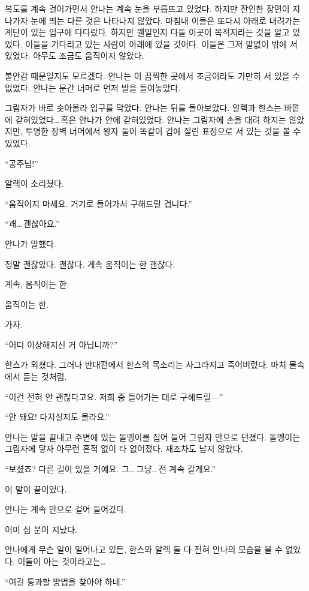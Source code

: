 복도를 계속 걸어가면서 안나는 계속 눈을 부릅뜨고 있었다. 하지만 잔인한 장면이 지나가자 눈에 띄는 다른 것은 나타나지 않았다. 마침내 이들은 또다시 아래로 내려가는 계단이 있는 입구에 다다랐다. 하지만 웬일인지 다들 이곳이 목적지라는 것을 알고 있었다. 이들을 기다리고 있는 사람이 아래에 있을 것이다. 이들은 그저 말없이 밖에 서 있었다. 아무도 조금도 움직이지 않았다.

불안감 때문일지도 모르겠다. 안나는 이 끔찍한 곳에서 조금이라도 가만히 서 있을 수 없었다. 안나는 문간 너머로 먼저 발을 들여놓았다.

그림자가 바로 솟아올라 입구를 막았다. 안나는 뒤를 돌아보았다. 알렉과 한스는 바깥에 갇혀있었다\ldots\,혹은 안나가 안에 갇혀있었다. 안나는 그림자에 손을 대려 하지는 않았지만, 투명한 장벽 너머에서 왕자 둘이 똑같이 겁에 질린 표정으로 서 있는 것을 볼 수 있었다.

``공주님!''

알렉이 소리쳤다.

``움직이지 마세요. 거기로 들어가서 구해드릴 겁니다.''

``괘\ldots\,괜찮아요.''

안나가 말했다.

정말 괜찮았다. 괜찮다. 계속 움직이는 한 괜찮다.

계속, 움직이는 한.

움직이는 한.

가자.

``어디 이상해지신 거 아닙니까?''

한스가 외쳤다. 그러나 반대편에서 한스의 목소리는 사그라지고 죽어버렸다. 마치 물속에서 듣는 것처럼.

``이건 전혀 안 괜찮다고요. 저희 중 들어가는 대로 구해드릴—''

``안 돼요! 다치실지도 몰라요.''

안나는 말을 끝내고 주변에 있는 돌멩이를 집어 들어 그림자 안으로 던졌다. 돌멩이는 그림자에 닿자 아무런 흔적 없이 타 없어졌다. 재조차도 남지 않았다.

``보셨죠? 다른 길이 있을 거예요. 그\ldots\,그냥\ldots\,전 계속 갈게요.''

이 말이 끝이었다.

안나는 계속 안으로 걸어 들어갔다.

\textbreak

이미 십 분이 지났다.

안나에게 무슨 일이 일어나고 있든, 한스와 알렉 둘 다 전혀 안나의 모습을 볼 수 없었다. 이들이 아는 것이라고는\ldots

``여길 통과할 방법을 찾아야 하네.''

